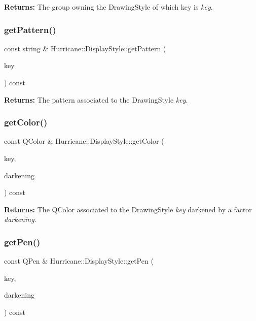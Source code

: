 {\bfseries Returns\+:} The group owning the Drawing\+Style of which key is {\itshape key}. \mbox{\label{classHurricane_1_1DisplayStyle_ab347efa0a703fd8fe012715102aba53b}} 
\subsubsection{\texorpdfstring{get\+Pattern()}{getPattern()}}
{\footnotesize\ttfamily const string \& Hurricane\+::\+Display\+Style\+::get\+Pattern (\begin{DoxyParamCaption}\item[{const \textbf{ Name} \&}]{key }\end{DoxyParamCaption}) const}

{\bfseries Returns\+:} The pattern associated to the Drawing\+Style {\itshape key}. \mbox{\label{classHurricane_1_1DisplayStyle_a42be63b69aa05b6fd3e25c89a90f0267}} 
\subsubsection{\texorpdfstring{get\+Color()}{getColor()}}
{\footnotesize\ttfamily const Q\+Color \& Hurricane\+::\+Display\+Style\+::get\+Color (\begin{DoxyParamCaption}\item[{const \textbf{ Name} \&}]{key,  }\item[{const H\+S\+Vr \&}]{darkening }\end{DoxyParamCaption}) const}

{\bfseries Returns\+:} The Q\+Color associated to the Drawing\+Style {\itshape key} darkened by a factor {\itshape darkening}. \mbox{\label{classHurricane_1_1DisplayStyle_aaa3e98aa185fed644943f1c89a49b7d0}} 
\subsubsection{\texorpdfstring{get\+Pen()}{getPen()}}
{\footnotesize\ttfamily const Q\+Pen \& Hurricane\+::\+Display\+Style\+::get\+Pen (\begin{DoxyParamCaption}\item[{const \textbf{ Name} \&}]{key,  }\item[{const H\+S\+Vr \&}]{darkening }\end{DoxyParamCaption}) const}

